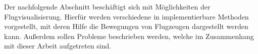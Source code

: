 Der nachfolgende Abschnitt beschäftigt sich mit Möglichkeiten der Flugvisualisierung. Hierfür werden verschiedene in \MatSim implementierbare Methoden vorgestellt, mit deren Hilfe die Bewegungen von Flugzeugen dargestellt werden kann. 
Außerdem sollen Probleme beschrieben werden, welche im Zusammenhang mit dieser Arbeit aufgetreten sind. 